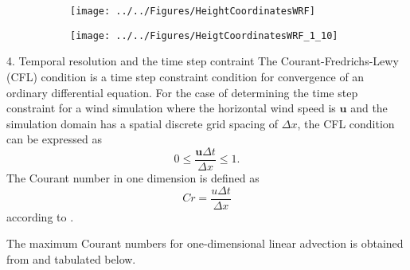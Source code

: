 \documentclass{beamer}
\newcommand{\ub}{\bm {u}\xspace}						%
\begin{document}
\begin{frame}
\begin{figure}[htp]
	\centering
	\begin{subfigure}{0.49\textwidth} 
		\centering
		\texttt{[image: ../../Figures/HeightCoordinatesWRF]}
	\end{subfigure}
	\begin{subfigure}{0.49\textwidth}
		\centering
		\texttt{[image: ../../Figures/HeigtCoordinatesWRF\_1\_10]}
	\end{subfigure}
\end{figure}
\end{frame}


\begin{frame}[fragile, t]{4. Temporal resolution and the time step contraint}
The Courant-Fredrichs-Lewy (CFL) condition is a time step constraint condition for convergence of an ordinary differential equation. 
For the case of determining the time step constraint for a wind simulation where the horizontal wind speed is $\ub$ and the simulation domain has a spatial discrete grid spacing of $\Delta x$, the CFL condition can be expressed as 
\begin{equation}
0 \leq \frac{\ub\Delta t}{\Delta x} \leq 1.
\label{CFLcondition}
\end{equation}
The Courant number in one dimension is defined as 
\begin{equation}
Cr = \frac{u\Delta t}{\Delta x}
\label{Cr}
\end{equation}
according to \citet{skamarock2008description}.

The maximum Courant numbers for one-dimensional linear advection is obtained from \citet{wicker2002time} and tabulated below. 
\end{frame}
\end{document}
